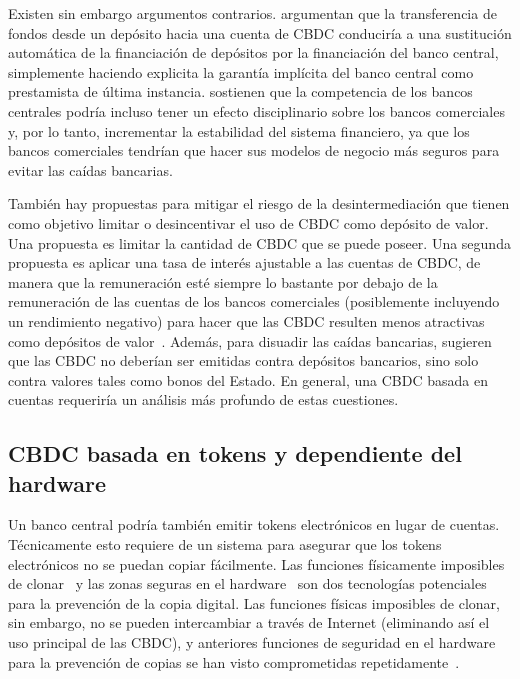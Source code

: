 \documentclass[10pt,spanish]{article}
\begin{document}
Existen sin embargo argumentos contrarios. \citet{Brunnermeier} argumentan
que la transferencia de fondos desde un
depósito hacia una cuenta de CBDC conduciría a una sustitución automática de
la financiación de depósitos por la financiación del banco central,
simplemente haciendo explicita la garantía implícita del banco central como
prestamista de última instancia. \citet{Berentsen}
sostienen que la competencia de los bancos centrales podría incluso tener un
efecto disciplinario sobre los bancos comerciales y, por lo tanto, incrementar
la estabilidad del sistema financiero, ya que los bancos comerciales tendrían
que hacer sus modelos de negocio más seguros para evitar las caídas bancarias.

También hay propuestas para mitigar el riesgo de la desintermediación
que tienen como objetivo limitar o desincentivar el uso de CBDC como
depósito de valor. Una propuesta es limitar la cantidad de CBDC que se
puede poseer. Una segunda propuesta es aplicar una tasa de interés
ajustable a las cuentas de CBDC, de manera que la remuneración esté
siempre lo bastante por debajo de la remuneración de las cuentas de los
bancos comerciales (posiblemente incluyendo un rendimiento negativo)
para hacer que las CBDC resulten menos atractivas como depósitos de
valor~\cite{Kumhof,Bindseil}. Además, para disuadir las
caídas bancarias, \citet{Kumhof} sugieren que las CBDC no
deberían ser emitidas contra depósitos bancarios, sino solo contra
valores tales como bonos del Estado. En general, una CBDC basada en
cuentas requeriría un análisis más profundo de estas cuestiones.

\hypertarget{cbdc-basada-en-tokens-y-dependiente-del-hardware}{%
\subsection{CBDC basada en tokens y dependiente del hardware}
\label{cbdc-basada-en-tokens-y-dependiente-del-hardware}}

Un banco central podría también emitir tokens electrónicos en lugar de
cuentas. Técnicamente esto requiere de un sistema para asegurar que los tokens
electrónicos no se puedan copiar fácilmente. Las funciones físicamente
imposibles de clonar~\cite[véase][]{Katzenbeisser} y las zonas seguras en
el hardware~\cite[véase][]{Alves,Pinto} son dos tecnologías potenciales para
la prevención de la copia digital. Las funciones físicas imposibles de clonar,
sin embargo, no se pueden intercambiar a través de Internet (eliminando así el
uso principal de las CBDC), y anteriores funciones de seguridad en el hardware
para la prevención de copias se han visto comprometidas
repetidamente~\cite[véase p. ej.][]{Wojtczuk,Johnston,Lapid}.
\end{document}
